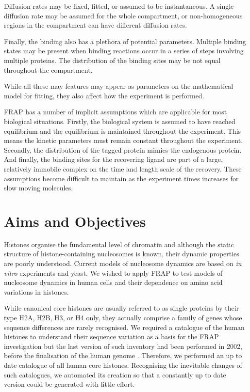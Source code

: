     Diffusion rates may be fixed, fitted, or assumed to be instantaneous.
    A single diffusion rate may be assumed for the whole
    compartment, or non-homogeneous regions in the compartment
    can have different diffusion rates.

    Finally, the binding also has a plethora of potential parameters.  Multiple
    binding states may be present when binding reactions occur in a
    series of steps involving multiple proteins.  The distribution of
    the binding sites may be not equal throughout the compartment.

    While all these may features may appear
    as parameters on the mathematical model for
    fitting, they also affect how the experiment is performed.

    FRAP has a number of implicit assumptions which are applicable
    for most biological situations.
    Firstly, the biological system is assumed to have
    reached equilibrium and the equilibrium
    is maintained throughout the experiment.
    This means the kinetic parameters
    must remain constant throughout the experiment.
    Secondly, the distribution of the tagged protein mimics the endogenous
    protein.
    And finally, the binding sites for the recovering ligand
    are part of a large, relatively immobile
    complex on the time and length scale of the recovery.
    These assumptions become difficult to maintain as the experiment
    times increases for slow moving molecules.


\section{Aims and Objectives}

  Histones organise the fundamental level of chromatin and
  although the static structure of histone-containing nucleosomes is
  known, their dynamic properties are poorly understood.  Current
  models of nucleosome dynamics are based on \textit{in vitro}
  experiments and yeast.  We wished to apply FRAP to test
  models of nucleosome dynamics in human cells and their dependence on
  amino acid variations in histones.

  While canonical core histones are usually referred to as single
  proteins by their type H2A, H2B,
  H3, or H4 only, they actually comprise a family of genes whose
  sequence differences are rarely recognised.
  We required a catalogue of the human histones to understand their
  sequence variation as a basis for the FRAP investigation
  but the last version of such inventory had been performed in
  2002, before the finalisation of the human genome \citep{Marzluff02}.
  Therefore, we performed an up to
  date catalogue of all human core histones.  Recognising the inevitable
  changes of such catalogues, we automated its creation so that a
  constantly up to date version could be generated with little effort.

